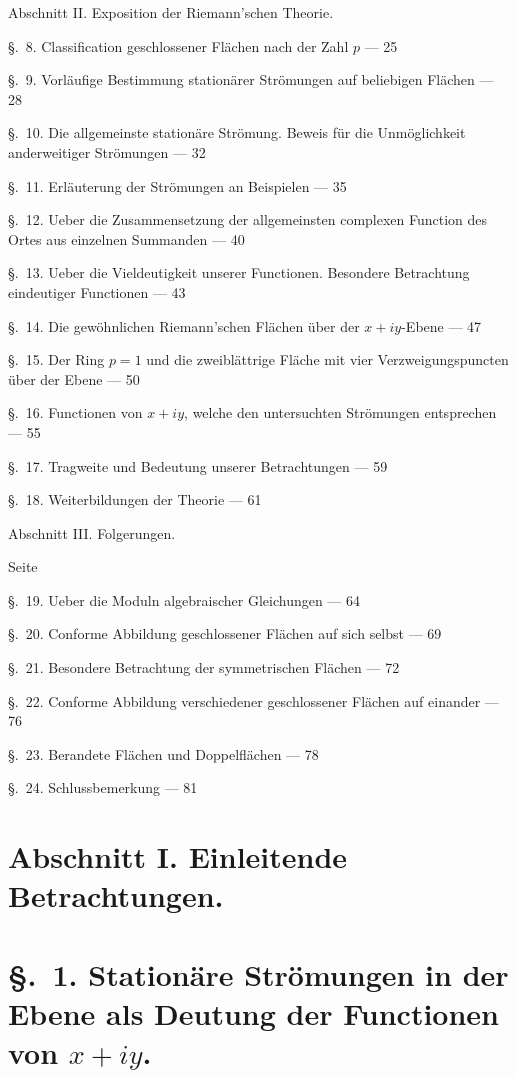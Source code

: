 \documentclass{article}
\begin{document}
Abschnitt II. Exposition der Riemann'schen Theorie.

§.~8. Classification geschlossener Flächen nach der Zahl $p$ --- 25

§.~9. Vorläufige Bestimmung stationärer Strömungen auf beliebigen Flächen --- 28

§.~10. Die allgemeinste stationäre Strömung. Beweis für die Unmöglichkeit anderweitiger Strömungen --- 32

§.~11. Erläuterung der Strömungen an Beispielen --- 35

§.~12. Ueber die Zusammensetzung der allgemeinsten complexen Function des Ortes aus einzelnen Summanden --- 40

§.~13. Ueber die Vieldeutigkeit unserer Functionen. Besondere Betrachtung eindeutiger Functionen --- 43

§.~14. Die gewöhnlichen Riemann'schen Flächen über der $x + iy$-Ebene --- 47

§.~15. Der Ring $p = 1$ und die zweiblättrige Fläche mit vier Verzweigungspuncten über der Ebene --- 50

§.~16. Functionen von $x + iy$, welche den untersuchten Strömungen entsprechen --- 55

§.~17. Tragweite und Bedeutung unserer Betrachtungen --- 59

§.~18. Weiterbildungen der Theorie --- 61


Abschnitt III. Folgerungen.

Seite

§.~19. Ueber die Moduln algebraischer Gleichungen --- 64

§.~20. Conforme Abbildung geschlossener Flächen auf sich selbst --- 69

§.~21. Besondere Betrachtung der symmetrischen Flächen --- 72

§.~22. Conforme Abbildung verschiedener geschlossener Flächen auf einander --- 76

§.~23. Berandete Flächen und Doppelflächen --- 78

§.~24. Schlussbemerkung --- 81


\section*{Abschnitt I. Einleitende Betrachtungen.}

\section*{§.~1. Stationäre Strömungen in der Ebene als Deutung der Functionen von $x + iy$.}
\end{document}
